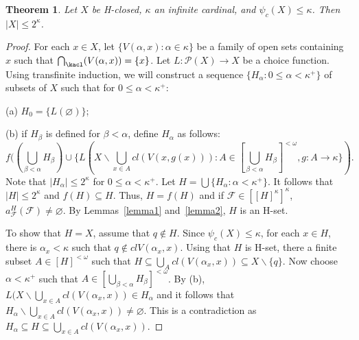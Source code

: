 \documentclass[11pt]{amsart}
\newif\ifdraft\draftfalse
\newtheorem{theorem}{Theorem}[section]
\theoremstyle{definition}
\theoremstyle{remark}
\numberwithin{equation}{section}
\begin{document}
\begin{theorem}{{\immediate{}}{\ifdraft\hspace{-\lastskip}\vadjust{\vspace{-1mm}\smash{\llap{{\tt {{kappafilter}}}\hspace{8mm}}}\vspace{1mm}}\fi}}
Let $X$ be H-closed,  ${\kappa}$ an infinite cardinal, and $\psi_c(X) \leq {\kappa}$.  Then $|X|\leq 2^{\kappa}$.
\end{theorem}

\begin{proof}
For each $x \in X$, let $\{V({\alpha}, x) : {\alpha} \in {\kappa}\}$ be a family of open sets containing $x$ such that $\bigcap_\kacl(V({\alpha},x)) = \{x\}$. Let $L:{\mathcal P}(X) \rightarrow X$ be a choice function.  Using transfinite induction, we will construct a sequence $\{H_{\alpha}: 0\leq \alpha<\kappa^+\}$ of subsets of $X$ such that for $0\leq \alpha<\kappa^+$: 

(a) $H_0 = \{L(\varnothing)\}$; 

(b) if $H_{\beta}$ is defined for $\beta < \alpha$, define $H_{\alpha}$ as follows:
$$f((\bigcup_{\beta <\alpha}H_{\beta})
\cup 
\{L(X \backslash \bigcup_{x \in A} cl(V(x,g(x))) : A \in [\bigcup_{\beta <\alpha}H_{\beta}]^{<\omega}, g :A \rightarrow {\kappa}\}).$$
Note that $|H_{\alpha} | \leq 2^{\kappa}$ for $0 \leq \alpha < \kappa^+$.
Let $H = \bigcup\{H_{\alpha}: {\alpha}  < {\kappa}^+\}$. It follows that $|H| \leq 2^{\kappa}$ and $f(H) \subseteq H$. Thus, $H = f(H)$ and  if ${\mathcal F} \in [[H]^{\kappa}]^{\kappa}$, $a^H_{\mathcal F}({\mathcal F}) \ne \varnothing$. By Lemmas~\ref{lemma1} and~\ref{lemma2}, $H$ is an H-set.

To show that $H = X$, assume that  $q \notin H$. Since $\psi_c(X)\leq {\kappa}$, for each $x \in H$, there is ${\alpha}_x < {\kappa}$ such that $q \not\in clV({\alpha}_x,x)$.  Using that $H$ is H-set, there a finite subset $A \in [H]^{<\omega}$ such that $H \subseteq \bigcup_Acl(V({\alpha}_x,x)) \subseteq X\backslash \{q\}$.
Now choose ${\alpha} <{\kappa}^+$ such that $A\in [\bigcup_{\beta <{\alpha}}H_{\beta}]^{<\omega}$. By (b), $L(X\backslash \bigcup_{x \in A} cl(V({\alpha}_x,x)) \in H_{\alpha}$ and it follows that $H_{\alpha}\backslash \bigcup_{x \in A} cl(V({\alpha}_x,x)) \ne \varnothing$.  This is a contradiction as $H_{\alpha} \subseteq H \subseteq \bigcup_{x \in A}cl(V({\alpha}_x,x))$.
\end{proof}
\end{document}
